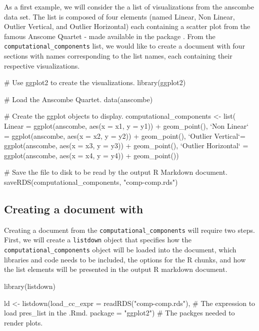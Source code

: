 As a first example, we will consider the a list of visualizations from
the anscombe data set. The list is composed of four 
\citep{wickham2016}elements (named Linear, Non Linear, Outlier Vertical,
and Outlier Horizontal) each containing a scatter plot from the famous
Anscome Quartet - made available in the  package
\citep{R}. From the \texttt{computational\_components} list, we would
like to create a document with four sections with names corresponding to
the list names, each containing their respective visualizations.

\begin{Schunk}
\begin{Sinput}
# Use ggplot2 to create the visualizations.
library(ggplot2)

# Load the Anscombe Quartet.
data(anscombe)

# Create the ggplot objects to display.
  computational_components <- list(
    Linear = ggplot(anscombe, aes(x = x1, y = y1)) + geom_point(),
    `Non Linear` = ggplot(anscombe, aes(x = x2, y = y2)) + geom_point(),
    `Outlier Vertical`= ggplot(anscombe, aes(x = x3, y = y3)) + geom_point(),
    `Outlier Horizontal` =  ggplot(anscombe, aes(x = x4, y = y4)) + geom_point())

# Save the file to disk to be read by the output R Markdown document.
saveRDS(computational_components, "comp-comp.rds")
\end{Sinput}
\end{Schunk}

\hypertarget{creating-a-document-with}{%
\subsection{\texorpdfstring{Creating a document with
}{Creating a document with }}\label{creating-a-document-with}}

Creating a document from the \texttt{computational\_components} will
require two steps. First, we will create a \texttt{listdown} object that
specifies how the \texttt{computational\_components} object will be
loaded into the document, which libraries and code needs to be included,
the options for the R chunks, and how the list elements will be
presented in the output R markdown document.

\begin{Schunk}
\begin{Sinput}
library(listdown)

ld <- listdown(load_cc_expr = readRDS("comp-comp.rds"), # The expression to load pres_list in the .Rmd.
               package = "ggplot2")                     # The packges needed to render plots.
\end{Sinput}
\end{Schunk}

